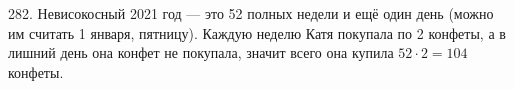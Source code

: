 282. Невисокосный 2021 год --- это 52 полных недели и ещё один день (можно им считать 1 января, пятницу). Каждую неделю Катя покупала по 2 конфеты, а в лишний день она конфет не покупала, значит всего она купила $52\cdot2=104$ конфеты.\\
